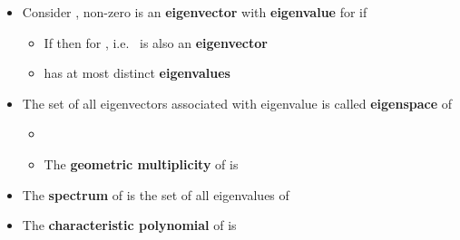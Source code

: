 \begin{itemize}

      \item
            Consider , non-zero
             is an \textbf{eigenvector} with
            \textbf{eigenvalue}  for  if

            \begin{itemize}

                  \item
                        If  then
                         for
                        , i.e.~ is also an
                        \textbf{eigenvector}
                  \item
                         has at most  distinct \textbf{eigenvalues}
            \end{itemize}
      \item
            The set of all eigenvectors associated with eigenvalue \iMbox{\lambda}
            is called \textbf{eigenspace}  of 

            \begin{itemize}

                  \item
                  \item
                        The \textbf{geometric multiplicity} of \iMbox{\lambda} is
            \end{itemize}
      \item
            The \textbf{spectrum}
             of  is
            the set of all eigenvalues of 
      \item
            The \textbf{characteristic polynomial} of  is

            \begin{itemize}


\end{itemize}
\end{itemize}

